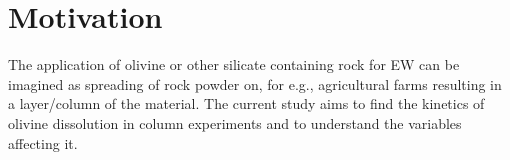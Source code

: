 \section{Motivation}
The application of olivine or other silicate containing rock for EW can be imagined as spreading of rock powder on, for e.g., agricultural farms resulting in a layer/column of the material. The current study aims to find the kinetics of olivine dissolution in column experiments and to understand the variables affecting it.  
 
